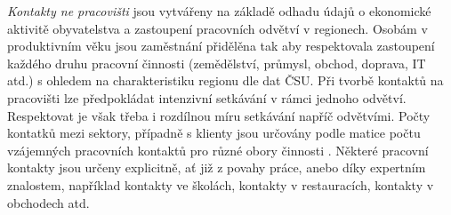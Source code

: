 
\emph{Kontakty ne pracovišti} jsou vytvářeny na základě odhadu údajů o ekonomické aktivitě obyvatelstva a zastoupení pracovních odvětví v regionech. Osobám v produktivním věku jsou zaměstnání přidělěna tak aby respektovala zastoupení každého druhu pracovní činnosti (zemědělství, průmysl, obchod, doprava, IT atd.) s ohledem na charakteristiku regionu dle dat ČSU. Při tvorbě kontaktů na pracovišti lze předpokládat intenzivní setkávání v rámci jednoho odvětví. Respektovat je však třeba i rozdílnou míru setkávání napříč odvětvími. Počty kontatků mezi sektory, případně s klienty jsou určovány podle matice počtu vzájemných pracovních kontaktů pro různé obory činnosti \cite{Prem_etal2017}. Některé pracovní kontakty jsou určeny explicitně, ať již z povahy práce, anebo díky expertním znalostem, například kontakty ve školách, kontakty v restauracích, kontakty v obchodech atd.






